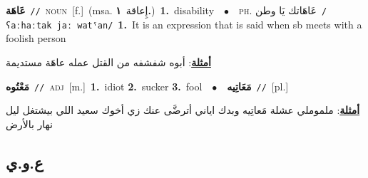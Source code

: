 \documentclass[10pt,a4paper,twoside]{article} %
\begin{document}
\begin{multicols}{2}
{\setlength\topsep{0pt}\textbf{\foreignlanguage{arabic}{عَاهَة}}\ {\color{gray}\texttt{//}\color{black}}\ \textsc{noun}\ [f.]\ \color{gray}(msa. \foreignlanguage{arabic}{إِعاقة}~\foreignlanguage{arabic}{\textbf{١.}})\color{black}\ \textbf{1.}~disability\ \ $\bullet$\ \ \textsc{ph.} \color{gray} \foreignlanguage{arabic}{عَاهَاتك يَا وطن}\color{black}\ {\color{gray}\texttt{/{\sffamily ʕaːhaːtak jaː watˤan}/}\color{black}}\ \textbf{1.}~It is an expression that is said when sb meets with a foolish person\  \begin{flushright}\color{gray}\foreignlanguage{arabic}{\textbf{\underline{\foreignlanguage{arabic}{أمثلة}}}: أبوه شفشفه من القتل عمله عاهَة مستديمة}\end{flushright}\color{black}} \vspace{2mm}

{\setlength\topsep{0pt}\textbf{\foreignlanguage{arabic}{مَعْتُوه}}\ {\color{gray}\texttt{//}\color{black}}\ \textsc{adj}\ [m.]\ \textbf{1.}~idiot  \textbf{2.}~sucker  \textbf{3.}~fool\ \ $\bullet$\ \ \setlength\topsep{0pt}\textbf{\foreignlanguage{arabic}{مَعَاتِيه}}\ {\color{gray}\texttt{//}\color{black}}\ [pl.]\  \begin{flushright}\color{gray}\foreignlanguage{arabic}{\textbf{\underline{\foreignlanguage{arabic}{أمثلة}}}: ملموملي عشلة مَعاتِيه وبدك اياني أترضَّى عنك زي أخوك سعيد اللي بيشتغل ليل نهار بالأرض}\end{flushright}\color{black}} \vspace{2mm}

\vspace{-3mm}
\subsection*{\color{blue}\foreignlanguage{arabic}{ع.و.ي}\color{blue}{}} 


\end{multicols}
\end{document}
